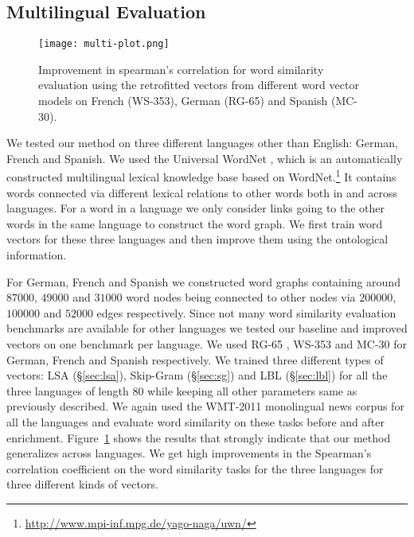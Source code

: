 \documentclass[11pt]{article}
\begin{document}
\subsection{Multilingual Evaluation}
\label{sec:multilingual}

\begin{figure}[!tb]
  \centering
  \texttt{[image: multi-plot.png]}
  \caption{Improvement in spearman's correlation for word similarity evaluation using the
  retrofitted vectors from different word vector models on French (WS-353), German (RG-65)
  and Spanish (MC-30).}
  \label{fig:multi-lang}
\end{figure}

We tested our method on three different languages other than English: German,
French and Spanish. We used the Universal WordNet \cite{deMeloWeikum2009}, which 
is an automatically constructed multilingual lexical knowledge base based on 
WordNet.\footnote{\url{http://www.mpi-inf.mpg.de/yago-naga/uwn/}} 
It contains words connected via different lexical relations to other words both
in and across languages. For a word in a language we only consider links going to
the other words in the same language to construct the word graph. We first train
word vectors for these three languages and then improve them using the ontological
information.

For German, French and Spanish we constructed word graphs containing around $87000$, $49000$
and $31000$ word nodes being connected to other nodes via $200000$, $100000$ and $52000$ 
edges respectively. 
Since not many word similarity evaluation benchmarks are available for other languages 
we tested our baseline and improved vectors on one benchmark per language.
We used RG-65 \cite{Gurevych:2005:USC:2145899.2145986}, WS-353 \cite{Joubarne:2011:CSS:2018192.2018218} 
and MC-30 \cite{Hassan:2009:CSR:1699648.1699665} for German, French and Spanish respectively. 
We trained three different types of vectors: LSA (\S\ref{sec:lsa}), Skip-Gram (\S\ref{sec:sg})
and LBL (\S\ref{sec:lbl}) for all the three languages of length 80 while keeping all other parameters
same as previously described. We again used the WMT-2011 monolingual news corpus for all the 
languages and evaluate word similarity on these tasks before and after enrichment. 
Figure~\ref{fig:multi-lang} shows the results that strongly 
indicate that our method generalizes across languages. We get high improvements in the 
Spearman's correlation coefficient on the word similarity tasks for the three languages for three
different kinds of vectors.
\end{document}
